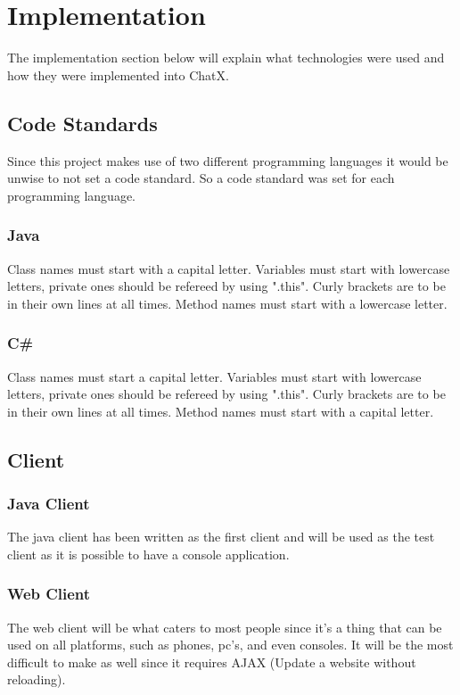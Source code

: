 \chapter{Implementation}

The implementation section below will explain what technologies were used and how they were implemented into ChatX.

\section{Code Standards}
Since this project makes use of two different programming languages it would be unwise to not set a code standard. So a code standard was set for each programming language.

\subsection{Java}
Class names must start with a capital letter.
Variables must start with lowercase letters, private ones should be refereed by using ".this".
Curly brackets are to be in their own lines at all times.
Method names must start with a lowercase letter.


\subsection{C\#}
Class names must start a capital letter.
Variables must start with lowercase letters, private ones should be refereed by using ".this".
Curly brackets are to be in their own lines at all times.
Method names must start with a capital letter.

\section{Client}

\subsection{Java Client}

The java client has been written as the first client and will be used as the test client as it is possible to have a console application.

\subsection{Web Client}

The web client will be what caters to most people since it's a thing that can be used on all platforms, such as phones, pc's, and even consoles. It will be the most difficult to make as well since it requires AJAX (Update a website without reloading).

